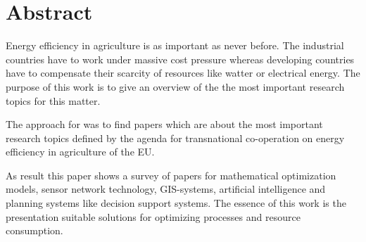 \chapter*{Abstract}

Energy efficiency in agriculture is as important as never before. The industrial countries have to work under massive cost pressure whereas developing countries have to compensate their scarcity of resources like watter or electrical energy. The purpose of this work is to give an overview of the the most important research topics for this matter.

The approach for was to find papers which are about the most important research topics defined by the agenda for transnational co-operation on energy efficiency in agriculture of the EU. 

As result this paper shows a survey of papers for mathematical optimization models, sensor network technology, GIS-systems, artificial intelligence and planning systems like decision support systems. The essence of this work is the presentation suitable solutions for optimizing processes and resource consumption. 

